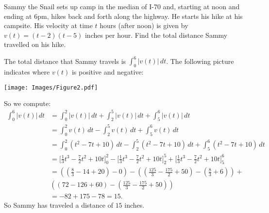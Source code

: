\documentclass[nooutcomes]{ximera}
\renewenvironment{freeResponse}{
\ifhandout\setbox0\vbox\bgroup\else
\begin{trivlist}\item[\hskip \labelsep\bfseries Solution:\hspace{2ex}]
\fi}
{\ifhandout\egroup\else
\end{trivlist}
\fi}
\renewcommand{\d}{\,d}
\newcommand{\eval}[1]{\bigg[ #1 \bigg]}
\begin{document}
\begin{problem}
\begin{enumerate}
	\item  Sammy the Snail sets up camp in the median of I-70 and, starting at noon and ending at 6pm, hikes back and forth along the highway.  He starts his hike at his campsite.  His velocity at time $t$ hours (after noon)  is given by $v(t)=(t-2)(t-5)$ inches per hour.  Find the total distance Sammy travelled on his hike.
		\begin{freeResponse}
		The total distance that Sammy travels is $\int_0^6 \left| v(t) \right| \d t$.
		The following picture indicates where $v(t)$ is positive and negative:
			\begin{image}
			\texttt{[image: Images/Figure2.pdf]}
			\end{image}
		So we compute:
			\begin{align*}
			\int_0^6 \left| v(t) \right| \d t &= \int_0^2 \left| v(t) \right| \d t + \int_2^5 \left| v(t) \right| \d t + \int_5^6 \left| v(t) \right| \d t  \\
			&= \int_0^2 v(t) \d t - \int_2^5 v(t) \d t + \int_5^6 v(t) \d t  \\
			&= \int_0^2 (t^2 - 7t + 10) \d t - \int_2^5 (t^2 - 7t + 10) \d t + \int_5^6 (t^2 - 7t + 10) \d t  \\
			&= \eval{\frac{1}{3}t^3-\frac{7}{2}t^2+10t}_0^2-\eval{\frac{1}{3}t^3-\frac{7}{2}t^2+10t}_2^5+\eval{\frac{1}{3}t^3-\frac{7}{2}t^2+10t}_5^6  \\
			&= \left( \left(\frac{8}{3}-14+20 \right)-0\right)-\left( \left( \frac{125}{3}-\frac{175}{2}+50 \right)-\left( \frac{8}{3}+6 \right) \right)+  \\
			&\left( \left( 72-126+60 \right) - \left( \frac{125}{3} - \frac{175}{2} + 50 \right) \right)  \\
			&= -82+175-78=15.
			\end{align*}
		So Sammy has traveled a distance of $15$ inches.
		\end{freeResponse}
	\end{enumerate}
\end{problem}
\end{document}
